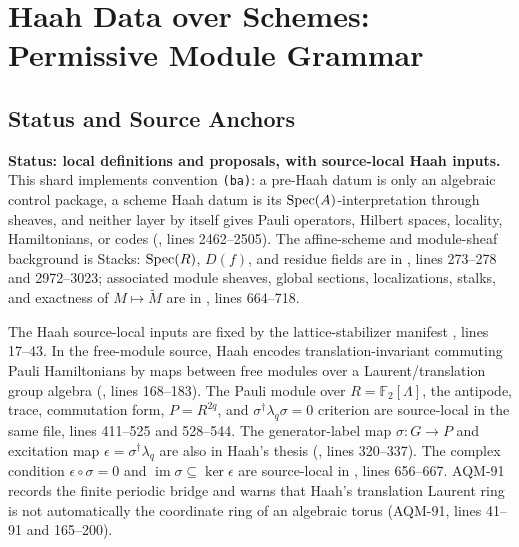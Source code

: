 
\section{Haah Data over Schemes: Permissive Module Grammar}
\label{sec:haah-data-scheme-modules}

\subsection{Status and Source Anchors}

\textbf{Status: local definitions and proposals, with source-local Haah
inputs.}  This shard implements convention \texttt{(ba)}: a pre-Haah datum is
only an algebraic control package, a scheme Haah datum is its
\(\operatorname{Spec}(A)\)-interpretation through sheaves, and neither layer by itself gives
Pauli operators, Hilbert spaces, locality, Hamiltonians, or codes
(, lines 2462--2505).  The affine-scheme and module-sheaf
background is Stacks: \(\operatorname{Spec}(R)\), \(D(f)\), and residue fields are in
, lines
273--278 and 2972--3023; associated module sheaves, global sections,
localizations, stalks, and exactness of \(M\mapsto\widetilde M\) are in
, lines
664--718.

The Haah source-local inputs are fixed by the lattice-stabilizer manifest
, lines 17--43.  In the
free-module source, Haah encodes translation-invariant commuting Pauli
Hamiltonians by maps between free modules over a Laurent/translation group
algebra
(,
lines 168--183).  The Pauli module over \(R=\mathbb F_2[\Lambda]\), the
antipode, trace, commutation form, \(P=R^{2q}\), and
\(\sigma^\dagger\lambda_q\sigma=0\) criterion are source-local in the same
file, lines 411--525 and 528--544.  The generator-label map
\(\sigma:G\to P\) and excitation map \(\epsilon=\sigma^\dagger\lambda_q\) are
also in Haah's thesis
(,
lines 320--337).  The complex condition
\(\epsilon\circ\sigma=0\) and \(\operatorname{im}\sigma\subseteq\ker\epsilon\)
are source-local in
,
lines 656--667.  AQM-91 records the finite periodic bridge and warns that
Haah's translation Laurent ring is not automatically the coordinate ring of an
algebraic torus (AQM-91, lines 41--91 and 165--200).

